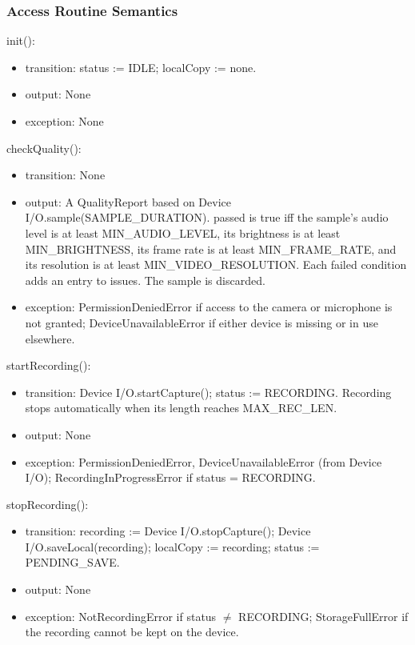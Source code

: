 \documentclass[12pt, titlepage]{article}
\begin{document}
\subsubsection{Access Routine Semantics}

\noindent init():
\begin{itemize}
\item transition: status := IDLE; localCopy := none.
\item output: None
\item exception: None
\end{itemize}

\noindent checkQuality():
\begin{itemize}
\item transition: None
\item output: A QualityReport based on Device I/O.sample(SAMPLE\_DURATION). passed is true iff the sample's audio level is at least MIN\_AUDIO\_LEVEL, its brightness is at least MIN\_BRIGHTNESS, its frame rate is at least MIN\_FRAME\_RATE, and its resolution is at least MIN\_VIDEO\_RESOLUTION. Each failed condition adds an entry to issues. The sample is discarded.
\item exception: PermissionDeniedError if access to the camera or microphone is not granted; DeviceUnavailableError if either device is missing or in use elsewhere.
\end{itemize}

\noindent startRecording():
\begin{itemize}
\item transition: Device I/O.startCapture(); status := RECORDING. Recording stops automatically when its length reaches MAX\_REC\_LEN.
\item output: None
\item exception: PermissionDeniedError, DeviceUnavailableError (from Device I/O); RecordingInProgressError if status = RECORDING.
\end{itemize}

\noindent stopRecording():
\begin{itemize}
\item transition: recording := Device I/O.stopCapture(); Device I/O.saveLocal(recording); localCopy := recording; status := PENDING\_SAVE.
\item output: None
\item exception: NotRecordingError if status $\neq$ RECORDING; StorageFullError if the recording cannot be kept on the device.
\end{itemize}
\end{document}
